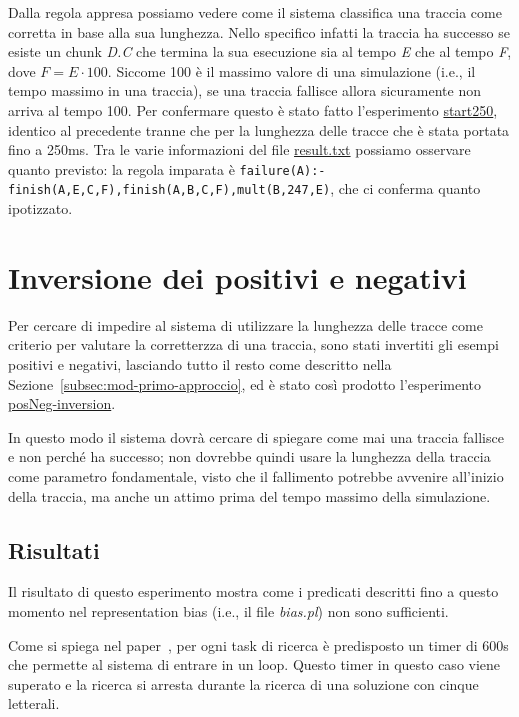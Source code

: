 Dalla regola appresa possiamo vedere come il sistema classifica una traccia come corretta in base alla sua lunghezza. Nello specifico infatti la traccia ha successo se esiste un chunk \textit{D.C} che termina la sua esecuzione sia al tempo \textit{E} che al tempo \textit{F}, dove $F=E\cdot100$. Siccome 100 è il massimo valore di una simulazione (i.e., il tempo massimo in una traccia), se una traccia fallisce allora sicuramente non arriva al tempo 100. Per confermare questo è stato fatto l'esperimento \href{https://github.com/edoardosarri24/numsynth/tree/main/my-experiments/2-start250/}{start250}, identico al precedente tranne che per la lunghezza delle tracce che è stata portata fino a 250ms. Tra le varie informazioni del file \href{https://github.com/edoardosarri24/numsynth/tree/main/my-experiments/1-start250/result.txt}{result.txt} possiamo osservare quanto previsto: la regola imparata è \texttt{failure(A):- finish(A,E,C,F),finish(A,B,C,F),mult(B,247,E)}, che ci conferma quanto ipotizzato.

\section{Inversione dei positivi e negativi}
Per cercare di impedire al sistema di utilizzare la lunghezza delle tracce come criterio per valutare la corretterzza di una traccia, sono stati invertiti gli esempi positivi e negativi, lasciando tutto il resto come descritto nella Sezione~\ref{subsec:mod-primo-approccio}, ed è stato così prodotto l'esperimento \href{https://github.com/edoardosarri24/numsynth/tree/main/my-experiments/3-posNeg-inversion}{posNeg-inversion}.

In questo modo il sistema dovrà cercare di spiegare come mai una traccia fallisce e non perché ha successo; non dovrebbe quindi usare la lunghezza della traccia come parametro fondamentale, visto che il fallimento potrebbe avvenire all'inizio della traccia, ma anche un attimo prima del tempo massimo della simulazione.

\subsection{Risultati}
Il risultato di questo esperimento mostra come i predicati descritti fino a questo momento nel representation bias (i.e., il file \textit{bias.pl}) non sono sufficienti.

Come si spiega nel paper~\cite{numsynth}, per ogni task di ricerca è predisposto un timer di 600s che permette al sistema di entrare in un loop. Questo timer in questo caso viene superato e la ricerca si arresta durante la ricerca di una soluzione con cinque letterali.

